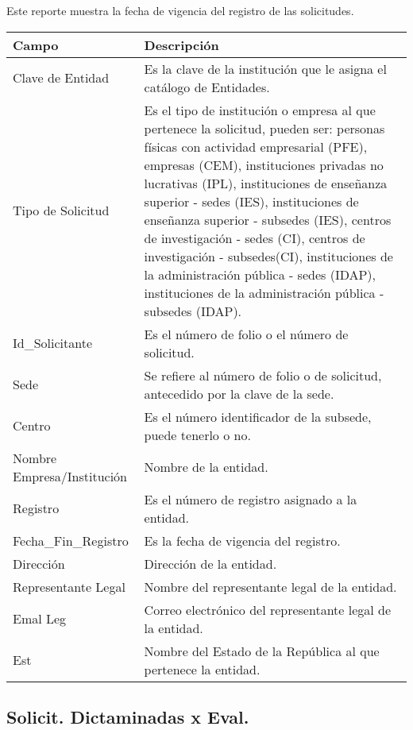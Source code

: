 Este reporte muestra la fecha de vigencia del registro de las solicitudes.\\

\begin{tabular}{ m{} m{}  }%
	\rowcolor{gray1} {\bf Campo} &  {\bf Descripción} \\ \hline \hline

	Clave de Entidad & Es la clave de la institución que le asigna el catálogo de Entidades.\\
	\rowcolor{gray1}Tipo de Solicitud & Es el tipo de institución o empresa al que pertenece la solicitud, pueden ser: personas físicas con actividad empresarial (PFE), empresas (CEM), instituciones privadas no lucrativas (IPL), instituciones de enseñanza superior - sedes (IES), instituciones de enseñanza superior - subsedes (IES), centros de investigación - sedes (CI), centros de investigación - subsedes(CI), instituciones de la administración pública - sedes (IDAP), instituciones de la administración pública - subsedes (IDAP).\\
	Id\_Solicitante & Es el número de folio o el número de solicitud.\\
	\rowcolor{gray1}Sede & Se refiere al número de folio o de solicitud, antecedido por la clave de la sede.\\
	Centro & Es el número identificador de la subsede, puede tenerlo o no.\\
	\rowcolor{gray1}Nombre Empresa/Institución & Nombre de la entidad.\\
	Registro & Es el número de registro asignado a la entidad.\\
	\rowcolor{gray1}Fecha\_Fin\_Registro & Es la fecha de vigencia del registro.\\
	Dirección & Dirección de la entidad.\\
	\rowcolor{gray1}Representante Legal & Nombre del representante legal de la entidad.\\
	Emal Leg & Correo electrónico del representante legal de la entidad.\\
	\rowcolor{gray1}Est & Nombre del Estado de la República al que pertenece la entidad.\\
\end{tabular}

\subsection{Solicit. Dictaminadas x Eval.}
\label{appendix:Reportes:PeopleSoft:SolicitDictaminadaxEval}

